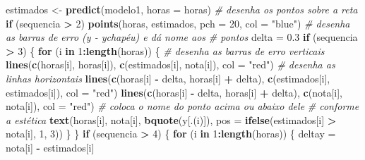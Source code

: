 \documentclass[
]{book}
\newenvironment{Shaded}{\begin{snugshade}}{\end{snugshade}}
\newcommand{\AttributeTok}[1]{\textcolor[rgb]{0.13,0.29,0.53}{#1}}
\newcommand{\CommentTok}[1]{\textcolor[rgb]{0.56,0.35,0.01}{\textit{#1}}}
\newcommand{\ControlFlowTok}[1]{\textcolor[rgb]{0.13,0.29,0.53}{\textbf{#1}}}
\newcommand{\DecValTok}[1]{\textcolor[rgb]{0.00,0.00,0.81}{#1}}
\newcommand{\FloatTok}[1]{\textcolor[rgb]{0.00,0.00,0.81}{#1}}
\newcommand{\FunctionTok}[1]{\textcolor[rgb]{0.13,0.29,0.53}{\textbf{#1}}}
\newcommand{\NormalTok}[1]{#1}
\newcommand{\OtherTok}[1]{\textcolor[rgb]{0.56,0.35,0.01}{#1}}
\newcommand{\SpecialCharTok}[1]{\textcolor[rgb]{0.81,0.36,0.00}{\textbf{#1}}}
\newcommand{\StringTok}[1]{\textcolor[rgb]{0.31,0.60,0.02}{#1}}
\begin{document}
\begin{Shaded}
\begin{Highlighting}[]
\NormalTok{    estimados }\OtherTok{\textless{}{-}} \FunctionTok{predict}\NormalTok{(modelo1, }\AttributeTok{horas =}\NormalTok{ horas)}
    \CommentTok{\# desenha os pontos sobre a reta}
    \ControlFlowTok{if}\NormalTok{ (sequencia }\SpecialCharTok{\textgreater{}} \DecValTok{2}\NormalTok{)}
        \FunctionTok{points}\NormalTok{(horas, estimados, }\AttributeTok{pch =} \DecValTok{20}\NormalTok{, }\AttributeTok{col =} \StringTok{"blue"}\NormalTok{)}
    \CommentTok{\# desenha as barras de erro (y {-} ychapéu) e dá nome aos}
    \CommentTok{\# pontos}
\NormalTok{    delta }\OtherTok{=} \FloatTok{0.3}
    \ControlFlowTok{if}\NormalTok{ (sequencia }\SpecialCharTok{\textgreater{}} \DecValTok{3}\NormalTok{) \{}
        \ControlFlowTok{for}\NormalTok{ (i }\ControlFlowTok{in} \DecValTok{1}\SpecialCharTok{:}\FunctionTok{length}\NormalTok{(horas)) \{}
            \CommentTok{\# desenha as barras de erro verticais}
            \FunctionTok{lines}\NormalTok{(}\FunctionTok{c}\NormalTok{(horas[i], horas[i]), }\FunctionTok{c}\NormalTok{(estimados[i], nota[i]),}
                \AttributeTok{col =} \StringTok{"red"}\NormalTok{)}
            \CommentTok{\# desenha as linhas horizontais}
            \FunctionTok{lines}\NormalTok{(}\FunctionTok{c}\NormalTok{(horas[i] }\SpecialCharTok{{-}}\NormalTok{ delta, horas[i] }\SpecialCharTok{+}\NormalTok{ delta), }\FunctionTok{c}\NormalTok{(estimados[i],}
\NormalTok{                estimados[i]), }\AttributeTok{col =} \StringTok{"red"}\NormalTok{)}
            \FunctionTok{lines}\NormalTok{(}\FunctionTok{c}\NormalTok{(horas[i] }\SpecialCharTok{{-}}\NormalTok{ delta, horas[i] }\SpecialCharTok{+}\NormalTok{ delta), }\FunctionTok{c}\NormalTok{(nota[i],}
\NormalTok{                nota[i]), }\AttributeTok{col =} \StringTok{"red"}\NormalTok{)}
            \CommentTok{\# coloca o nome do ponto acima ou abaixo dele}
            \CommentTok{\# conforme a estética}
            \FunctionTok{text}\NormalTok{(horas[i], nota[i], }\FunctionTok{bquote}\NormalTok{(y[.(i)]), }\AttributeTok{pos =} \FunctionTok{ifelse}\NormalTok{(estimados[i] }\SpecialCharTok{\textgreater{}}
\NormalTok{                nota[i], }\DecValTok{1}\NormalTok{, }\DecValTok{3}\NormalTok{))}
\NormalTok{        \}}
\NormalTok{    \}}
    \ControlFlowTok{if}\NormalTok{ (sequencia }\SpecialCharTok{\textgreater{}} \DecValTok{4}\NormalTok{) \{}
        \ControlFlowTok{for}\NormalTok{ (i }\ControlFlowTok{in} \DecValTok{1}\SpecialCharTok{:}\FunctionTok{length}\NormalTok{(horas)) \{}
\NormalTok{            deltay }\OtherTok{=}\NormalTok{ nota[i] }\SpecialCharTok{{-}}\NormalTok{ estimados[i]}

\end{Highlighting}
\end{Shaded}
\end{document}

